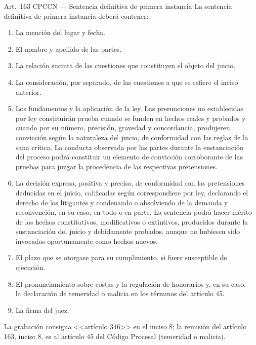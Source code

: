 \documentclass[12pt,oneside]{book}
\begin{document}
\begin{norma}{Art.~163 CPCCN --- Sentencia definitiva de primera instancia}
La sentencia definitiva de primera instancia deber\'a contener:
\begin{enumerate}[label=\arabic*)]
    \item La menci\'on del lugar y fecha.
    \item El nombre y apellido de las partes.
    \item La relaci\'on sucinta de las cuestiones que constituyen el objeto del juicio.
    \item La consideraci\'on, por separado, de las cuestiones a que se refiere el inciso anterior.
    \item Los fundamentos y la aplicaci\'on de la ley. Las presunciones no establecidas por ley constituir\'an prueba cuando se funden en hechos reales y probados y cuando por su n\'umero, precisi\'on, gravedad y concordancia, produjeren convicci\'on seg\'un la naturaleza del juicio, de conformidad con las reglas de la sana cr\'itica. La conducta observada por las partes durante la sustanciaci\'on del proceso podr\'a constituir un elemento de convicci\'on corroborante de las pruebas para juzgar la procedencia de las respectivas pretensiones.
    \item La decisi\'on expresa, positiva y precisa, de conformidad con las pretensiones deducidas en el juicio, calificadas seg\'un correspondiere por ley, declarando el derecho de los litigantes y condenando o absolviendo de la demanda y reconvenci\'on, en su caso, en todo o en parte. La sentencia podr\'a hacer m\'erito de los hechos constitutivos, modificativos o extintivos, producidos durante la sustanciaci\'on del juicio y debidamente probados, aunque no hubiesen sido invocados oportunamente como hechos nuevos.
    \item El plazo que se otorgase para su cumplimiento, si fuere susceptible de ejecuci\'on.
    \item El pronunciamiento sobre costas y la regulaci\'on de honorarios y, en su caso, la declaraci\'on de temeridad o malicia en los t\'erminos del art\'iculo 45.
    \item La firma del juez.
\end{enumerate}
\end{norma}

\begin{note}
La grabaci\'on consigna <<art\'iculo 346>> en el inciso 8; la remisi\'on del art\'iculo 163, inciso 8, es al art\'iculo 45 del C\'odigo Procesal (temeridad o malicia).
\end{note}
\end{document}
